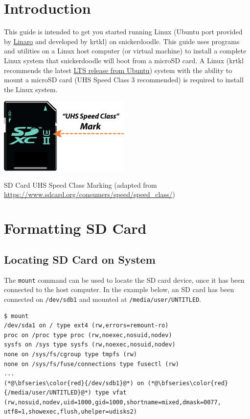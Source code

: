 \section{Introduction}

This guide is intended to get you started running Linux (Ubuntu port provided by \href{http://www.linaro.org}{Linaro} and developed by krtkl) on snickerdoodle. This guide uses programs and utilities on a Linux host computer (or virtual machine) to install a complete Linux system that snickerdoodle will boot from a microSD card. A Linux (krtkl recommends the latest \href{http://www.ubuntu.com/download/desktop/}{LTS release from Ubuntu}) system with the ability to mount a microSD card (UHS Speed Class 3 recommended) is required to install the Linux system.

\begin{marginfigure}
	\centering
	\includegraphics{images/card-marks-en.png}
	\caption[SD Card UHS Speed Class Marking adapted from \url{https://www.sdcard.org/consumers/speed/speed_class/}]{SD Card UHS Speed Class Marking (adapted from \url{https://www.sdcard.org/consumers/speed/speed_class/})}
\end{marginfigure}

\section{Formatting SD Card}

\subsection{Locating SD Card on System}
\label{sub:locatesd}

The \texttt{mount} command can be used to locate the SD card device, once it has been connected to the host computer. In the example below, an SD card has been connected on \texttt{/dev/sdb1} and mounted at \texttt{/media/user/UNTITLED}. \\

\begin{lstlisting}[style=text]
$ mount
/dev/sda1 on / type ext4 (rw,errors=remount-ro)
proc on /proc type proc (rw,noexec,nosuid,nodev)
sysfs on /sys type sysfs (rw,noexec,nosuid,nodev)
none on /sys/fs/cgroup type tmpfs (rw)
none on /sys/fs/fuse/connections type fusectl (rw)
...
(*@\bfseries\color{red}{/dev/sdb1}@*) on (*@\bfseries\color{red}{/media/user/UNTITLED}@*) type vfat (rw,nosuid,nodev,uid=1000,gid=1000,shortname=mixed,dmask=0077, utf8=1,showexec,flush,uhelper=udisks2)
\end{lstlisting}

